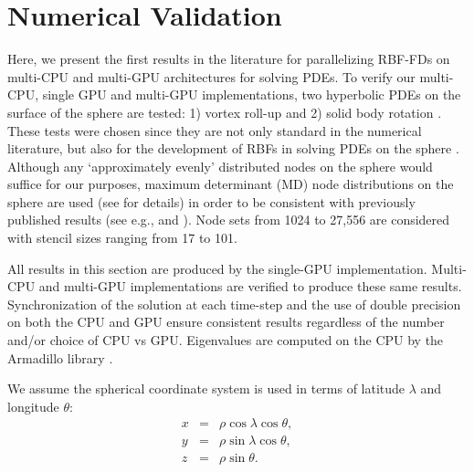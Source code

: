 \documentclass{report}
\begin{document}
\fi

\chapter{Numerical Validation} 

\label{chap:applications}

%



Here, we present the first results in the literature for parallelizing RBF-FDs on multi-CPU and multi-GPU architectures for solving PDEs. 
 To verify our multi-CPU, single GPU and multi-GPU implementations, two hyperbolic PDEs on the surface of the sphere are tested: 1) vortex roll-up \cite{NairTransport05, NairJablonowski08} and 2) solid body rotation \cite{JakobChien1995}. These tests were chosen since they are not only standard in the numerical literature, but also
for the development of RBFs in solving PDEs on the sphere \cite{FlyerWright07, Fornberg2008, FlyerLehto10, Fornberg2011a}. Although any `approximately evenly' distributed nodes on the sphere would suffice for our purposes, maximum determinant (MD) node distributions on the sphere are used (see \cite{Sloan2003} for details) in order to be consistent with previously published results (see e.g., \cite{FlyerWright07} and \cite{FornbergLehto11}). Node sets from 1024 to 27,556 are considered with stencil sizes ranging from 17 to 101.

All results in this section are produced by the single-GPU implementation. Multi-CPU and multi-GPU implementations are verified to produce these same results. Synchronization of the solution at each time-step and the use of double precision on both the CPU and GPU ensure consistent results regardless of the number and/or choice of CPU vs GPU. Eigenvalues are computed on the CPU by the Armadillo library \cite{armadillo2010}.


We assume the spherical coordinate system is used in terms of latitude $\lambda$ and longitude $\theta$:
\begin{eqnarray*} 
x & = & \rho \cos \lambda \cos \theta, 	\\
y & = & \rho \sin \lambda \cos \theta, 		\\
z & = & \rho \sin \theta.		
\end{eqnarray*}
\end{document}
